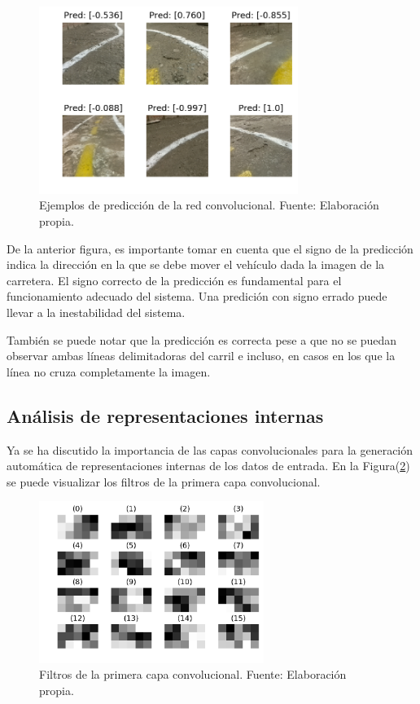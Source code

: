     \begin{figure}[!h] 
        \centering
        \includegraphics[width=0.75\textwidth]{img/testimg}
        \caption[Ejemplos de predicción de la red convolucional]{Ejemplos de predicción de la red convolucional. Fuente: Elaboración propia. }
        \label{fig:testimg}
    \end{figure}

    De la anterior figura, es importante tomar en cuenta que el signo de la predicción indica la dirección en la que se debe 
    mover el vehículo dada la imagen de la carretera. El signo correcto de la predicción es fundamental para el funcionamiento 
    adecuado del sistema. Una predición con signo errado puede llevar a la inestabilidad del sistema. 

    También se puede notar que la predicción es correcta pese a que no se puedan observar ambas líneas delimitadoras del carril 
    e incluso, en casos en los que la línea no cruza completamente la imagen.

    \subsection{Análisis de representaciones internas}\label{sec:representaciones}

    Ya se ha discutido la importancia de las capas convolucionales para la generación automática de representaciones internas 
    de los datos de entrada. En la Figura(\ref{fig:filtros1}) se puede visualizar los filtros de la primera capa convolucional.
    
    \begin{figure}[!h] 
        \centering
        \includegraphics[width=0.65\textwidth]{img/filtros1}
        \caption[Filtros de la primera capa convolucional]{Filtros de la primera capa convolucional. Fuente: Elaboración propia. }
        \label{fig:filtros1}
    \end{figure}

